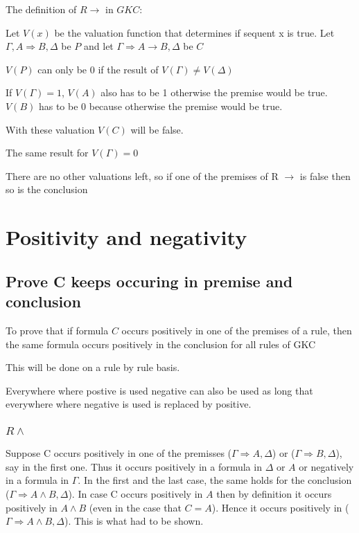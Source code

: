 \documentclass{article}
\newenvironment{scprooftree}[1]%
{\gdef\scalefactor{#1}\begin{center}\proofSkipAmount \leavevmode}%
{\scalebox{\scalefactor}{\DisplayProof}\proofSkipAmount \end{center} }
\begin{document}
The definition of $R\to$ in $GKC$:

\begin{scprooftree}{1}
\end{scprooftree}
Let $V(x)$ be the valuation function that determines if sequent x
is true.
Let $\Gamma, A \Rightarrow B, \Delta$ be $P$ and
let $\Gamma \Rightarrow A \to B, \Delta$ be $C$


$V(P)$ can only be 0 if the result of
$V(\Gamma) \not= V(\Delta)$

If $V(\Gamma) = 1$, $V(A)$ also has to be 1 otherwise the premise would be true.
$V(B)$ has to be 0 because otherwise the premise would be true.

With these valuation $V(C)$ will be false.

The same result for $V(\Gamma) = 0$

There are no other valuations left, so if one of the premises of R $\to$ is
false then so is the conclusion


\section{Positivity and negativity}
\subsection{Prove C keeps occuring in premise and conclusion}
To prove that if formula $C$ occurs positively in one of the premises of a rule,
then the same formula occurs positively in the conclusion for all rules of GKC

This will be done on a rule by rule basis.

Everywhere where postive is used negative can also be used as long
that everywhere where negative is used is replaced by positive.

\subsubsection{$R\wedge$}
Suppose C occurs positively in one of the premisses
($\Gamma \Rightarrow A, \Delta$) or ($\Gamma \Rightarrow B,\Delta$),
say in the first one. Thus it occurs positively in a formula in $\Delta$ or
$A$ or negatively in a formula in $\Gamma$. In the first and the last case,
the same holds for the conclusion ($\Gamma \Rightarrow A \wedge B, \Delta$).
In case C occurs positively in $A$ then by definition it occurs positively
in $A \wedge B$ (even in the case that $C = A$). Hence it occurs positively
in ($\Gamma \Rightarrow A \wedge B, \Delta$). This is what had to be shown.
\end{document}
